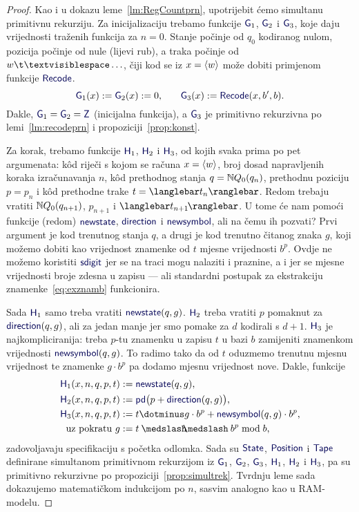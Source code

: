 \begin{proof}
	Kao i u dokazu leme~\ref{lm:RegCountprn}, upotrijebit ćemo simultanu primitivnu rekurziju. Za inicijalizaciju trebamo funkcije $\f G_1$, $\f G_2$ i $\f G_3$, koje daju vrijednosti traženih funkcija za $n=0$. Stanje počinje od $q_0$ kodiranog nulom, pozicija počinje od nule (lijevi rub), a traka počinje od $w\bl\ldots$, čiji kod se iz $x=\langle w\rangle$ može dobiti primjenom funkcije $\f{Recode}$.
\begin{equation}
    \f G_1(x):=\f G_2(x):=0\text,\qquad
    \f G_3(x):=\f{Recode}(x,b',b)\text.
\end{equation}
Dakle, $\f G_1=\f G_2=\f Z$ (inicijalna funkcija), a $\f G_3$ je primitivno rekurzivna po lemi~\ref{lm:recodeprn} i propoziciji~\ref{prop:konst}.

	Za korak, trebamo funkcije $\f H_1$, $\f H_2$ i $\f H_3$, od kojih svaka prima po pet argumenata: k\^od riječi s kojom se računa $x=\langle w\rangle$, broj dosad napravljenih koraka izračunavanja $n$, k\^od prethodnog stanja $q={\mathbb N} Q_0(q_n)$, prethodnu poziciju $p=p_n$ i k\^od prethodne trake $t=\knk{t_n}$. Redom trebaju vratiti ${\mathbb N} Q_0(q_{n+1})$, $p_{n+1}$ i $\knk{t_{n+1}\mspace{-2mu}}$. U tome će nam pomoći funkcije (redom) $\f{newstate}$, $\f{direction}$ i $\f{newsymbol}$, ali na čemu ih pozvati? Prvi argument je kod trenutnog stanja $q$, a drugi je kod trenutno čitanog znaka $g$, koji možemo dobiti kao vrijednost znamenke od $t$ mjesne vrijednosti $b^p$. Ovdje ne možemo koristiti $\f{sdigit}$ jer se na traci mogu nalaziti i praznine, a i jer se mjesne vrijednosti broje zdesna u zapisu --- ali standardni postupak za ekstrakciju znamenke~\eqref{eq:exznamb} funkcionira.

Sada $\f H_1$ samo treba vratiti $\f{newstate}(q,g)$. $\f H_2$ treba vratiti $p$ pomaknut za $\f{direction}(q,g)$, ali za jedan manje jer smo pomake za $d$ kodirali s $d+1$. $\f H_3$ je najkompliciranija: treba $p$-tu znamenku u zapisu $t$ u bazi $b$ zamijeniti znamenkom vrijednosti $\f{newsymbol}(q,g)$. To radimo tako da od $t$ oduzmemo trenutnu mjesnu vrijednost te znamenke $g\cdot b^p$ pa dodamo mjesnu vrijednost nove. Dakle, funkcije
\begin{align}
    \f H_1(x,n,q,p,t)&:=\f{newstate}(q,g)\text,\\
    \f H_2(x,n,q,p,t)&:=\f{pd}\bigl(p+\f{direction}(q,g)\bigr)\text,\\
    \f H_3(x,n,q,p,t)&:=t\dotminus g\cdot b^p+\f{newsymbol}(q,g)\cdot b^p\text,\\
    \label{eq:exznamb}\text{uz pokratu }g&:=t\div b^p\bmod b\text,
\end{align}
zadovoljavaju specifikaciju s početka odlomka. Sada su $\f{State}$, $\f{Position}$ i $\f{Tape}$ definirane simultanom primitivnom rekurzijom iz $\f G_1$, $\f G_2$, $\f G_3$, $\f H_1$, $\f H_2$ i $\f H_3$, pa su primitivno rekurzivne po propoziciji~\ref{prop:simultrek}. Tvrdnju leme sada dokazujemo matematičkom indukcijom po $n$, sasvim analogno kao u RAM-modelu.


\end{proof}
